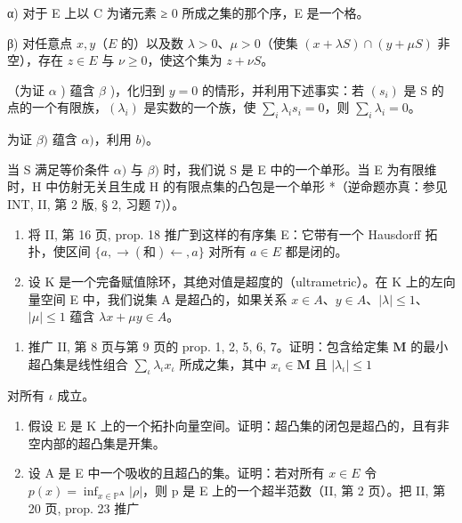 α) 对于 E 上以 C 为诸元素 ≥ 0 所成之集的那个序，E 是一个格。

β) 对任意点 \(x, y\)（\(E\) 的）以及数 \(\lambda > 0\)、\(\mu > 0\)（使集 \((x + \lambda S) \cap (y + \mu S)\) 非空），存在 \(z \in E\) 与 \(\nu \geqslant 0\)，使这个集为 \(z + \nu S\)。

（为证 \(\alpha\) ) 蕴含 \(\beta\) )，化归到 \(y = 0\) 的情形，并利用下述事实：若 \((s_i)\) 是 S 的点的一个有限族，\((\lambda_i)\) 是实数的一个族，使 \(\sum_{i} \lambda_i s_i = 0\)，则 \(\sum_{i} \lambda_i = 0\)。

为证 \(\beta)\) 蕴含 \(\alpha)\)，利用 \(b)\)。

当 S 满足等价条件 \(\alpha)\) 与 \(\beta)\) 时，我们说 S 是 E 中的一个单形。当 E 为有限维时，H 中仿射无关且生成 H 的有限点集的凸包是一个单形 *（逆命题亦真：参见 INT, II, 第 2 版, § 2, 习题 7)）。

\begin{enumerate}
\def\labelenumi{\arabic{enumi})}
\setcounter{enumi}{41}
\item
  将 II, 第 16 页, prop. 18 推广到这样的有序集 E：它带有一个 Hausdorff 拓扑，使区间 \(\{a, \to (\text{和}) \gets, a\}\) 对所有 \(a \in E\) 都是闭的。
\item
  设 K 是一个完备赋值除环，其绝对值是超度的（ultrametric）。在 K 上的左向量空间 E 中，我们说集 A 是超凸的，如果关系 \(x \in A\)、\(y \in A\)、\(|\lambda| \leqslant 1\)、\(|\mu| \leqslant 1\) 蕴含 \(\lambda x + \mu y \in A\)。
\end{enumerate}

\begin{enumerate}
\def\labelenumi{\alph{enumi})}
\tightlist
\item
  推广 II, 第 8 页与第 9 页的 prop. 1, 2, 5, 6, 7。证明：包含给定集 \(\mathbf{M}\) 的最小超凸集是线性组合 \(\sum_{\iota} \lambda_{\iota} x_{\iota}\) 所成之集，其中 \(x_{\iota} \in \mathbf{M}\) 且 \(|\lambda_{\iota}| \leqslant 1\)
\end{enumerate}

对所有 \(\iota\) 成立。

\begin{enumerate}
\def\labelenumi{\alph{enumi})}
\setcounter{enumi}{1}
\item
  假设 E 是 K 上的一个拓扑向量空间。证明：超凸集的闭包是超凸的，且有非空内部的超凸集是开集。
\item
  设 A 是 E 中一个吸收的且超凸的集。证明：若对所有 \(x \in E\) 令 \(p(x) = \inf_{x \in \mathbb{P}^{\mathbf{A}}} |\rho|\)，则 p 是 E 上的一个超半范数（II, 第 2 页）。把 II, 第 20 页, prop. 23 推广
\end{enumerate}

